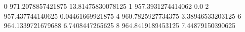 0 971.2078857421875 13.81475830078125
1 957.3931274414062 0.0
2 957.437744140625 0.04461669921875
4 960.7825927734375 3.38946533203125
6 964.1339721679688 6.7408447265625
8 964.8419189453125 7.44879150390625
